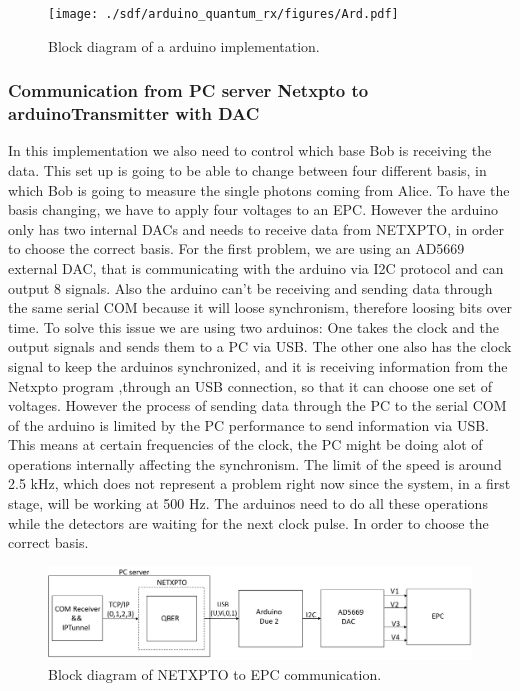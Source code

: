\begin{refsection}
	\begin{figure}[H] 
		\centering
		\texttt{[image: ./sdf/arduino\_quantum\_rx/figures/Ard.pdf]}
		\caption{Block diagram of a arduino implementation.}
		\label{fig:netxpto}
		
	\end{figure}

	\subsubsection{Communication from PC server Netxpto to arduinoTransmitter with DAC}
	In this implementation we also need to control which base Bob is receiving the data. This set up is going to be able to change between four different basis, in which Bob is going to measure the single photons coming from Alice. To have the basis changing, we have to apply four voltages to an EPC. However the arduino only has two internal DACs and needs to receive data from NETXPTO, in order to choose the correct basis. For the first problem, we are using an AD5669 external DAC, that is communicating with the arduino via I2C protocol and can output 8 signals. Also the arduino can't be receiving and sending data through the same serial COM because it will loose synchronism, therefore loosing bits over time. To solve this issue we are using two arduinos: One takes the clock and the output signals and sends them to a PC via USB. The other one also has the clock signal to keep the arduinos synchronized, and it is receiving information from the Netxpto program ,through an USB connection, so that it can choose one set of voltages. However the process of sending data through the PC to the serial COM of the arduino is limited by the PC performance to send information via USB. This means at certain frequencies of the clock, the PC might be doing alot of operations internally affecting the synchronism. The limit of the speed is around 2.5 kHz, which does not represent a problem right now since the system, in a first stage, will be working at 500 Hz. The arduinos need to do all these operations while the detectors are waiting for the next clock pulse. In order to choose the correct basis.
	
	\begin{figure}[H]
		
		\centering
		\includegraphics[width=1\linewidth]{./sdf/arduino_quantum_rx/figures/DAC.png}
		\caption{Block diagram of NETXPTO to EPC communication.}
		\label{fig:netxpto}


\end{figure}
\end{refsection}
